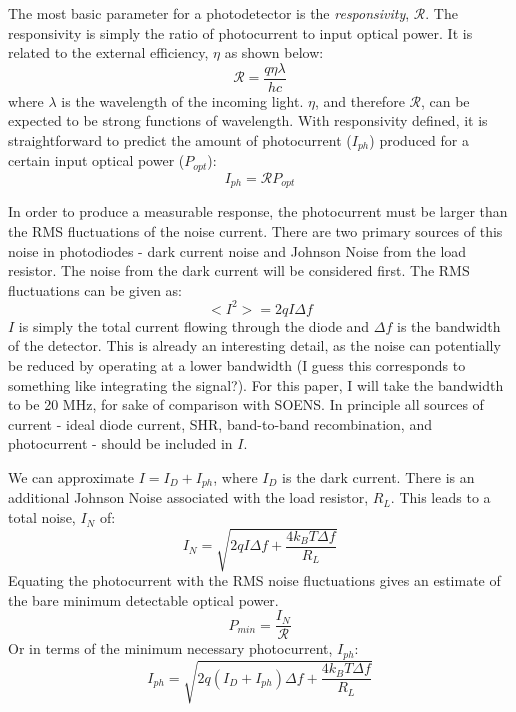 \documentclass[twocolumn]{article}
\begin{document}
The most basic parameter for a photodetector is the \textit{responsivity}, $\mathcal{R}$. The responsivity is simply the ratio of photocurrent to input optical power. It is related to the external efficiency, $\eta$ as shown below:
\begin{equation}
    \mathcal{R} = \frac{q\eta\lambda}{hc}
\end{equation}
where $\lambda$ is the wavelength of the incoming light. $\eta$, and therefore $\mathcal{R}$, can be expected to be strong functions of wavelength. With responsivity defined, it is straightforward to predict the amount of photocurrent ($I_{ph}$) produced for a certain input optical power ($P_{opt}$):
\begin{equation}
    I_{ph} = \mathcal{R}P_{opt}
\end{equation}

In order to produce a measurable response, the photocurrent must be larger than the RMS fluctuations of the noise current. There are two primary sources of this noise in photodiodes - dark current noise and Johnson Noise from the load resistor. The noise from the dark current will be considered first. The RMS fluctuations can be given as:
\begin{equation}
    <I^{2}> = 2qI\Delta f
\end{equation}
$I$ is simply the total current flowing through the diode and $\Delta f$ is the bandwidth of the detector. This is already an interesting detail, as the noise can potentially be reduced by operating at a lower bandwidth (I guess this corresponds to something like integrating the signal?). For this paper, I will take the bandwidth to be 20 MHz, for sake of comparison with SOENS. In principle all sources of current - ideal diode current, SHR, band-to-band recombination, and photocurrent - should be included in $I$. 

We can approximate $I = I_{D} + I_{ph}$, where $I_{D}$ is the dark current. There is an additional Johnson Noise associated with the load resistor, $R_{L}$. This leads to a total noise, $I_{N}$ of:
\begin{equation}
    I_{N} = \sqrt{2qI\Delta f + \frac{4k_{B}T\Delta f}{R_{L}}}
\end{equation}
Equating the photocurrent with the RMS noise fluctuations gives an estimate of the bare minimum detectable optical power.
\begin{equation}
    P_{min} = \frac{I_N}{\mathcal{R}}
\end{equation}
Or in terms of the minimum necessary photocurrent, $I_{ph}$:
\begin{equation}
    I_{ph} = \sqrt{2q(I_D+I_{ph})\Delta f + \frac{4k_{B}T\Delta f}{R_{L}}
    }
\end{equation}
\end{document}
